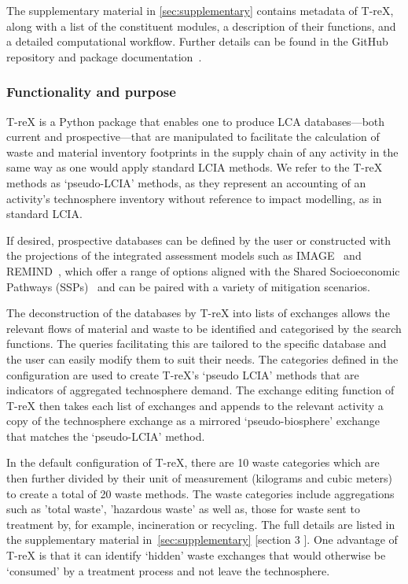 \documentclass[a4paper,fleqn,longmktitle]{cas-dc}
\begin{document}
The supplementary material in \autoref{sec:supplementary} contains metadata of T-reX, along with a list of the constituent modules, a description of their functions, and a detailed computational workflow. Further details can be found in the GitHub repository and package documentation~\citep{mcdowall2024T-reXgithub, mcdowall2023T-reXdocs}.

\subsubsection{Functionality and purpose}

T-reX is a Python package that enables one to produce LCA databases---both current and prospective---that are manipulated to facilitate the calculation of waste and material inventory footprints in the supply chain of any activity in the same way as one would apply standard LCIA methods. We refer to the T-reX methods as `pseudo-LCIA' methods, as they represent an accounting of an activity's technosphere inventory without reference to impact modelling, as in standard LCIA.

If desired, prospective databases can be defined by the user or constructed with the projections of the integrated assessment models such as IMAGE~\citep{stehfest2014image} and REMIND~\citep{remind2020model}, which offer a range of options aligned with the Shared Socioeconomic Pathways (SSPs)~\citep{ssp2020ghg} and can be paired with a variety of mitigation scenarios.

The deconstruction of the databases by T-reX into lists of exchanges allows the relevant flows of material and waste to be identified and categorised by the search functions. The queries facilitating this are tailored to the specific database and the user can easily modify them to suit their needs. The categories defined in the configuration are used to create T-reX's `pseudo LCIA' methods that are indicators of aggregated technosphere demand. The exchange editing function of T-reX then takes each list of exchanges and appends to the relevant activity a copy of the technosphere exchange as a mirrored `pseudo-biosphere' exchange that matches the `pseudo-LCIA' method.

In the default configuration of T-reX, there are 10 waste categories which are then further divided by their unit of measurement (kilograms and cubic meters) to create a total of 20 waste methods. The waste categories include aggregations such as 'total waste', 'hazardous waste' as well as, those for waste sent to treatment by, for example, incineration or recycling. The full details are listed in the supplementary material in~\autoref{sec:supplementary} [section 3 ]. One advantage of T-reX is that it can identify `hidden' waste exchanges that would otherwise be `consumed' by a treatment process and not leave the technosphere.
\end{document}
